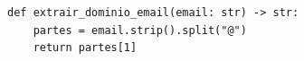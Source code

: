 \ifmostrarGabarito
\begin{verbatim}
def extrair_dominio_email(email: str) -> str:
    partes = email.strip().split("@")
    return partes[1]
\end{verbatim}

\fi
